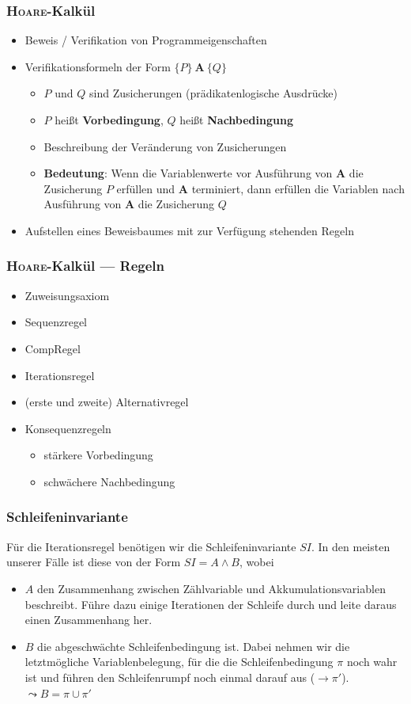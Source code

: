 \documentclass{beamer}
\renewcommand{\emph}[1]{\textbf{#1}}
\begin{document}
\begin{frame} \frametitle{\textsc{Hoare}-Kalkül}
	\begin{itemize}
		\item Beweis / Verifikation von Programmeigenschaften \pause 
		\item Verifikationsformeln der Form $\{P\} \ \mathbf{A} \ \{Q\}$
		\begin{itemize}
			\item $P$ und $Q$ sind Zusicherungen (prädikatenlogische Ausdrücke)
			\item $P$ heißt \emph{Vorbedingung}, $Q$ heißt \emph{Nachbedingung}
			\item Beschreibung der Veränderung von Zusicherungen \pause
			\item \emph{Bedeutung}: Wenn die Variablenwerte vor Ausführung von $\mathbf{A}$ die Zusicherung $P$ erfüllen und $\mathbf{A}$ terminiert, dann erfüllen die Variablen nach Ausführung von $\mathbf{A}$ die Zusicherung $Q$
		\end{itemize} \pause
		\item Aufstellen eines Beweisbaumes mit zur Verfügung stehenden Regeln
	\end{itemize}
\end{frame}


\begin{frame} \frametitle{\textsc{Hoare}-Kalkül --- Regeln}
	\begin{itemize}
		\item Zuweisungsaxiom
		\item Sequenzregel
		\item CompRegel
		\item Iterationsregel
		\item (erste und zweite) Alternativregel
		\item Konsequenzregeln
		\begin{itemize}
			\item stärkere Vorbedingung
			\item schwächere Nachbedingung
		\end{itemize}
	\end{itemize}
\end{frame}

\begin{frame} \frametitle{Schleifeninvariante}
	Für die Iterationsregel benötigen wir die Schleifeninvariante $SI$.
	In den meisten unserer Fälle ist diese von der Form $SI = A \land B$, wobei
	\begin{itemize}
		\item $A$ den Zusammenhang zwischen Zählvariable und Akkumulationsvariablen beschreibt. Führe dazu einige Iterationen der Schleife durch und leite daraus einen Zusammenhang her.
		\item $B$ die abgeschwächte Schleifenbedingung ist. Dabei nehmen wir die letztmögliche Variablenbelegung, für die die Schleifenbedingung $\pi$ noch wahr ist und führen den Schleifenrumpf noch einmal darauf aus ($\to \pi'$). \\
		$\leadsto B = \pi \cup \pi'$
	\end{itemize}
\end{frame}
\end{document}

